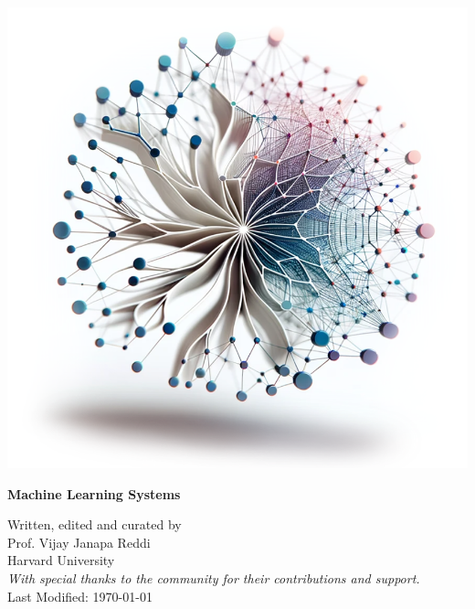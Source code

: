 \begin{titlepage}
  \begin{center}
    \thispagestyle{empty}
    \includegraphics[trim=0 -10 0 0, clip, width=\textwidth]{cover-image-white.png} %
    {{\Huge\bfseries Machine Learning Systems}\\[1em] \par}
    \vspace*{\fill}
    {\large Written, edited and curated by \\[.1cm] Prof. Vijay Janapa Reddi \\[.2cm] Harvard University \\[1em] \normalsize {\itshape With special thanks to the community for their contributions and support.} \\[1em] \vfill \scriptsize Last Modified: \today\par \vfill}
  \end{center}
\end{titlepage}
